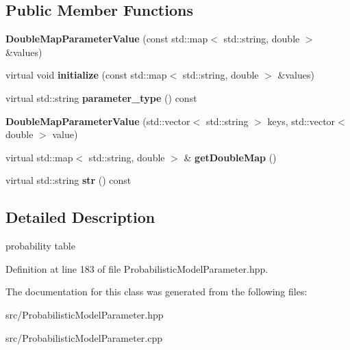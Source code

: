 \subsection*{Public Member Functions}
\begin{DoxyCompactItemize}
\item 
\mbox{\label{classtops_1_1DoubleMapParameterValue_aa2fd10d6c30872eeb61f0dc947c532a0}} 
{\bfseries Double\+Map\+Parameter\+Value} (const std\+::map$<$ std\+::string, double $>$ \&values)
\item 
\mbox{\label{classtops_1_1DoubleMapParameterValue_aa6b87b6f8903190e67d1b0de0119c6c9}} 
virtual void {\bfseries initialize} (const std\+::map$<$ std\+::string, double $>$ \&values)
\item 
\mbox{\label{classtops_1_1DoubleMapParameterValue_a75e63c08b1ff511654ad5ecdc77e37f1}} 
virtual std\+::string {\bfseries parameter\+\_\+type} () const
\item 
\mbox{\label{classtops_1_1DoubleMapParameterValue_a2a5509470f922714c774dce7776b70aa}} 
{\bfseries Double\+Map\+Parameter\+Value} (std\+::vector$<$ std\+::string $>$ keys, std\+::vector$<$ double $>$ value)
\item 
\mbox{\label{classtops_1_1DoubleMapParameterValue_a214ef931cd0400b0be92feeed773acf9}} 
virtual std\+::map$<$ std\+::string, double $>$ \& {\bfseries get\+Double\+Map} ()
\item 
\mbox{\label{classtops_1_1DoubleMapParameterValue_a25f2d12177f6c5bbcb5fb42b118bcdbd}} 
virtual std\+::string {\bfseries str} () const
\end{DoxyCompactItemize}


\subsection{Detailed Description}
probability table 

Definition at line 183 of file Probabilistic\+Model\+Parameter.\+hpp.



The documentation for this class was generated from the following files\+:\begin{DoxyCompactItemize}
\item 
src/Probabilistic\+Model\+Parameter.\+hpp\item 
src/Probabilistic\+Model\+Parameter.\+cpp\end{DoxyCompactItemize}
